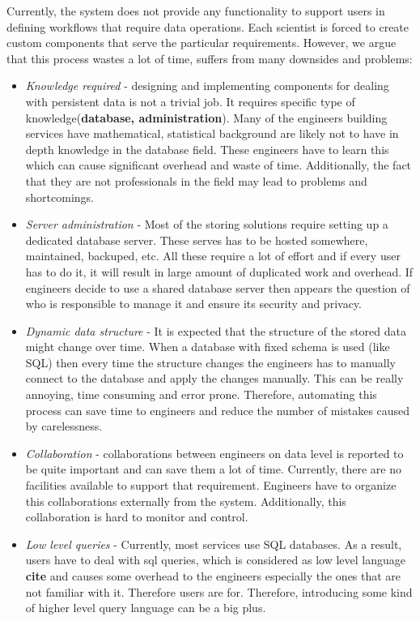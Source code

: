 Currently, the system does not provide any functionality to support users in defining workflows that require data operations. Each scientist is forced to create custom components that serve the particular requirements. However, we argue that this process wastes a lot of time, suffers from many downsides and problems:

\begin{itemize}
	\item \textit{Knowledge required} - designing and implementing components for dealing with persistent data is not a trivial job. It requires specific type of knowledge(\textbf{database, administration}). Many of the engineers building services have mathematical, statistical background are likely not to have in depth knowledge in the database field. These engineers have to learn this which can cause significant overhead and waste of time. Additionally, the fact that they are not professionals in the field may lead to problems and shortcomings.
	
	\item \textit{Server administration} - Most of the storing solutions require setting up a dedicated database server. These serves has to be hosted somewhere, maintained, backuped, etc. All these require a lot of effort and if every user has to do it, it will result in large amount of duplicated work and overhead. If engineers decide to use a shared database server then appears the question of who is responsible to manage it and ensure its security and privacy.
	
	\item \textit{Dynamic data structure} - It is expected that the structure of the stored data might change over time. When a database with fixed schema is used (like SQL) then every time the structure changes the engineers has to manually connect to the database and apply the changes manually. This can be really annoying, time consuming and error prone. Therefore, automating this process can save time to engineers and reduce the number of mistakes caused by carelessness. 
	
	\item \textit{Collaboration} - collaborations between engineers on data level is reported to be quite important and can save them a lot of time. Currently, there are no facilities available to support that requirement. Engineers have to organize this collaborations externally from the system. Additionally, this collaboration is hard to monitor and control.
	
	\item \textit{Low level queries} - Currently, most services use SQL databases. As a result, users have to deal with sql queries, which is considered as low level language \textbf{cite} and causes some overhead to the engineers especially the ones that are not familiar with it. Therefore users are for. Therefore, introducing some kind of higher level query language can be a big plus.
	

\end{itemize}
